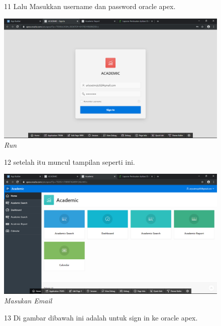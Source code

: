 \begin{enumerate}
\begin{figure}
\item[11] Lalu Masukkan username dan password oracle apex.
    \begin{center}
\includegraphics[scale=0.2]{figures/11.png}
    \caption{\textit{Run}}
        \end{center}
\label{gambar}
\end{figure}

\begin{figure}
\item[12] setelah itu muncul tampilan seperti ini.

    \begin{center}
\includegraphics[scale=0.2]{figures/12.png}
    \caption{\textit{Masukan Email}}
        \end{center}
\label{gambar}
\end{figure}

\begin{figure}
\item[13] Di gambar dibawah ini adalah untuk sign in ke oracle apex.


\end{figure}
\end{enumerate}

